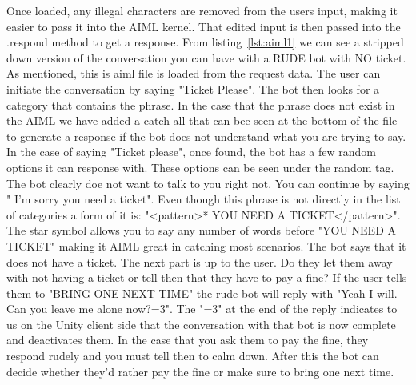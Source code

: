 Once loaded, any illegal characters are removed from the users input, making it easier to pass it into the AIML kernel. That edited input is then passed into the .respond method to get a response. From listing~\ref{lst:aiml1} we can see a stripped down version of the conversation you can have with a RUDE bot with NO ticket. As mentioned, this is aiml file is loaded from the request data. The user can initiate the conversation by saying "Ticket Please". The bot then looks for a category that contains the phrase. In the case that the phrase does not exist in the AIML we have added a catch all that can bee seen at the bottom of the file to generate a response if the bot does not understand what you are trying to say. In the case of saying "Ticket please", once found, the bot has a few random options it can response with. These options can be seen under the random tag. The bot clearly doe not want to talk to you right not. You can continue by saying " I'm sorry you need a ticket". Even though this phrase is not directly in the list of categories a form of it is: "<pattern>* YOU NEED A TICKET</pattern>". The star symbol allows you to say any number of words before "YOU NEED A TICKET" making it AIML great in catching most scenarios. The bot says that it does not have a ticket. The next part is up to the user. Do they let them away with not having a ticket or tell then that they have to pay a fine? If the user tells them to "BRING ONE NEXT TIME" the rude bot will reply with "Yeah I will. Can you leave me alone now?=3". The "=3" at the end of the reply indicates to us on the Unity client side that the conversation with that bot is now complete and deactivates them. In the case that you ask them to pay the fine, they respond rudely and you must tell then to calm down. After this the bot can decide whether they'd rather pay the fine or make sure to bring one next time.

